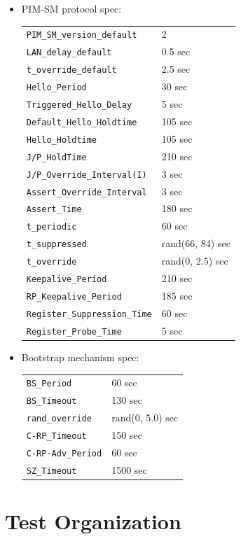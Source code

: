 \documentclass[11pt]{report}
\begin{document}
\begin{itemize}

\item PIM-SM protocol spec:

\begin{tabular}{ll}
\verb=PIM_SM_version_default=	& 2		\\	%
\verb=LAN_delay_default=	& 0.5 sec	\\
\verb=t_override_default=	& 2.5 sec	\\
\verb=Hello_Period=		& 30 sec	\\
\verb=Triggered_Hello_Delay=	& 5 sec		\\
\verb=Default_Hello_Holdtime=	& 105 sec	\\
\verb=Hello_Holdtime=		& 105 sec	\\
\verb=J/P_HoldTime=		& 210 sec	\\
\verb=J/P_Override_Interval(I)=	& 3 sec		\\
\verb=Assert_Override_Interval=	& 3 sec		\\
\verb=Assert_Time=		& 180 sec	\\
\verb=t_periodic=		& 60 sec	\\
\verb=t_suppressed=		& rand(66, 84) sec \\
\verb=t_override=		& rand(0, 2.5) sec \\
\verb=Keepalive_Period=		& 210 sec	\\
\verb=RP_Keepalive_Period=	& 185 sec	\\
\verb=Register_Suppression_Time= & 60 sec	\\
\verb=Register_Probe_Time=	& 5 sec
\end{tabular}

\item Bootstrap mechanism spec:

\begin{tabular}{ll}
\verb=BS_Period=		& 60 sec	\\
\verb=BS_Timeout=		& 130 sec	\\
\verb=rand_override=		& rand(0, 5.0) sec \\
\verb=C-RP_Timeout=		& 150 sec	\\
\verb=C-RP-Adv_Period=		& 60 sec	\\
\verb=SZ_Timeout=		& 1500 sec
\end{tabular}

\end{itemize}

\section{Test Organization}
\end{document}
